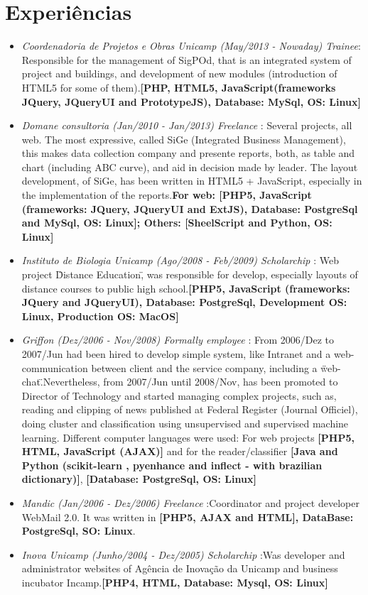 \documentclass[a4paper,10pt]{article}
\begin{document}
\section{Experiências}
\begin{itemize}
\item \emph{Coordenadoria de Projetos e Obras Unicamp (May/2013 - Nowaday) Trainee}: Responsible
for the management of SigPOd, that is an integrated system of project and buildings, and development of new modules (introduction of HTML5 for some of them).\textbf{[PHP, HTML5, JavaScript(frameworks JQuery, JQueryUI and PrototypeJS), Database: MySql, OS: Linux]}
\item \emph{Domane consultoria (Jan/2010 - Jan/2013) Freelance }: Several projects, all web. The most expressive, called SiGe (Integrated Business Management), this makes data collection company and presente reports, both, as table and chart (including ABC curve), and aid in decision made by leader. The layout development, of SiGe, has been written in HTML5 + JavaScript, especially in the implementation of the reports.\textbf{For web: [PHP5, JavaScript (frameworks: JQuery, JQueryUI and ExtJS), Database: PostgreSql and MySql, OS: Linux]; Others: [SheelScript and Python, OS: Linux]}
\item \emph{Instituto de Biologia Unicamp (Ago/2008 - Feb/2009) Scholarchip }: Web project \"Distance Education\", was responsible for develop, especially layouts of distance courses to public high school.\textbf{[PHP5, JavaScript (frameworks: JQuery and JQueryUI), Database: PostgreSql, Development OS: Linux, Production OS: MacOS]}
\item \emph{Griffon (Dez/2006 - Nov/2008) Formally employee }: From 2006/Dez to 2007/Jun had been hired to develop simple system, like Intranet and a web-communication between client and the service company, including a \"web-chat\".Nevertheless, from 2007/Jun until 2008/Nov, has been promoted to Director of Technology and started managing complex projects, such as, reading and clipping of news published at Federal Register (Journal Officiel), doing cluster and classification using unsupervised and supervised machine learning. Different computer languages were used: For web projects \textbf{[PHP5, HTML, JavaScript (AJAX)]} and for the reader/classifier \textbf{[Java and Python (scikit-learn , pyenhance and inflect - with brazilian dictionary)]}, \textbf{[Database: PostgreSql, OS: Linux]}
\item \emph{Mandic (Jan/2006 - Dez/2006) Freelance }:Coordinator and project developer WebMail 2.0. It was written in \textbf{[PHP5, AJAX and HTML], DataBase: PostgreSql, SO: Linux}.
\item \emph{Inova Unicamp (Junho/2004 - Dez/2005) Scholarchip }:Was developer and administrator websites of Agência de Inovação da Unicamp and business incubator Incamp.\textbf{[PHP4, HTML, Database: Mysql, OS: Linux]}
\end{itemize}
\end{document}
